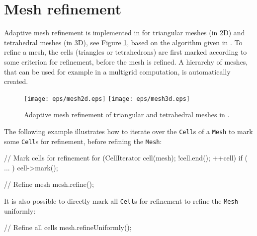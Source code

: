 \section{Mesh refinement}

Adaptive mesh refinement is implemented in \dolfin{} for triangular
meshes (in 2D) and tetrahedral meshes (in 3D), see Figure
\ref{fig:refinedmeshes}, based on the algorithm given in \cite{Bey95}.
To refine a mesh, the cells (triangles or tetrahedrons) are first
marked according to some criterion for refinement, before the mesh is
refined. A hierarchy of meshes, that can be used for example in a
multigrid computation, is automatically created.

\begin{figure}
  \begin{center}
    \texttt{[image: eps/mesh2d.eps]}
    \texttt{[image: eps/mesh3d.eps]}
    \caption{Adaptive mesh refinement of triangular and tetrahedral meshes in \dolfin{}.}
    \label{fig:refinedmeshes} 
  \end{center}
\end{figure}

The following example illustrates how to iterate over the \texttt{Cell}s of
a \texttt{Mesh} to mark some \texttt{Cell}s for refinement, before refining
the \texttt{Mesh}:
\begin{code}
  // Mark cells for refinement
  for (CellIterator cell(mesh); !cell.end(); ++cell)
    if ( ... )
      cell->mark();

  // Refine mesh
  mesh.refine();
\end{code}

It is also possible to directly mark all \texttt{Cell}s for refinement
to refine the \texttt{Mesh} uniformly:
\begin{code}
  // Refine all cells
  mesh.refineUniformly();
\end{code}
